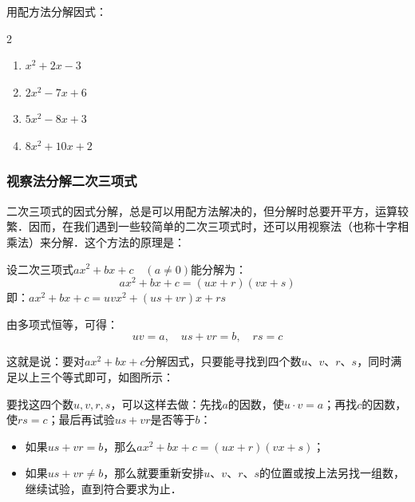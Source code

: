 \begin{ex}
    用配方法分解因式：
\begin{multicols}{2}
    \begin{enumerate}
        \item $x^2+2x-3$
        \item $2x^2-7x+6$
        \item $5x^2-8x+3$
        \item $8x^2+10x+2$
    \end{enumerate}
\end{multicols} 
\end{ex}

\subsubsection{视察法分解二次三项式}
二次三项式的因式分解，总是可以用配方法解决的，但分解时总要开平方，运算较繁．因而，在我们遇到一些较简单的二次三项式时，还可以用视察法（也称十字相乘法）来分解．这个方法的原理是：

设二次三项式$ax^2+bx+c\quad (a\ne 0)$能分解为：
\[ax^2+bx+c  =(ux+r)(vx+s)\]
即：$ax^2+bx+c=uv x^2+(us+vr)x+rs$

由多项式恒等，可得：
\[uv=a,\quad us+vr=b,\quad rs=c\]

这就是说：要对$ax^2+bx+c$分解因式，只要能寻找到四个数$u$、$v$、$r$、$s$，同时满足以上三个等式即可，如图所示：

\begin{center}
\end{center}


要找这四个数$u,v,r,s$，可以这样去做：先找$a$的因数，使$u\cdot v=a$；再找$c$的因数，使$rs=c$；最后再试验$us+vr$是否等于$b$：
\begin{itemize}
    \item 如果$us+vr=b$，那么$ax^2+bx+c= (ux+r) (vx+s)$；
\item 如果$us+vr\ne b$，那么就要重新安排$u$、$v$、$r$、$s$的位置或按上法另找一组数，继续试验，直到符合要求为止．
\end{itemize}

